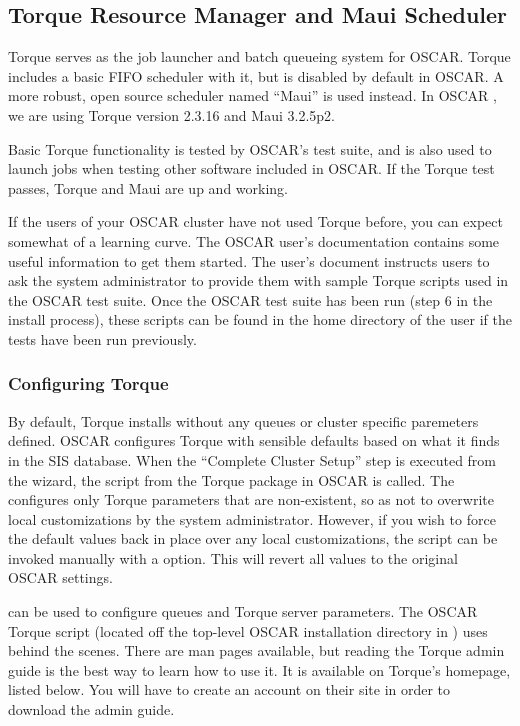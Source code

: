 %
%
%

\subsection{Torque Resource Manager and Maui Scheduler}
\label{app:torque-overview}

Torque serves as the job launcher and batch queueing system for
OSCAR. Torque includes a basic FIFO scheduler with it, but is
disabled by default in OSCAR.  A more robust, open source scheduler
named ``Maui'' is used instead.  In OSCAR \oscarversion, we are
using Torque version 2.3.16 and Maui 3.2.5p2.

Basic Torque functionality is tested by OSCAR's test suite, and is
also used to launch jobs when testing other software included in
OSCAR. If the Torque test passes, Torque and Maui are up and
working.

If the users of your OSCAR cluster have not used Torque before, you
can expect somewhat of a learning curve.  The OSCAR user's
documentation contains some useful information to get them started.
The user's document instructs users to ask the system administrator
to provide them with sample Torque scripts used in the OSCAR test
suite.  Once the OSCAR test suite has been run (step 6 in the
install process), these scripts can be found in the home directory
of the  user if the tests have been run previously.

\subsubsection{Configuring Torque}

By default, Torque installs without any queues or cluster specific
paremeters defined.  OSCAR configures Torque with sensible defaults
based on what it finds in the SIS database.  When the ``Complete
Cluster Setup'' step is executed from the wizard, the
 script from the Torque package in OSCAR is
called. The  configures only Torque parameters
that are non-existent, so as not to overwrite local customizations
by the system administrator.  However, if you wish to force the
default values back in place over any local customizations, the
 script can be invoked manually with a
 option.  This will revert all values to the original
OSCAR settings.

 can be used to configure queues and Torque server
parameters. The OSCAR Torque  script (located off
the top-level OSCAR installation directory in
) uses  behind the scenes.
There are man pages available, but reading the Torque admin guide is
the best way to learn how to use it. It is available on Torque's
homepage, listed below.  You will have to create an account on their
site in order to download the admin guide.


